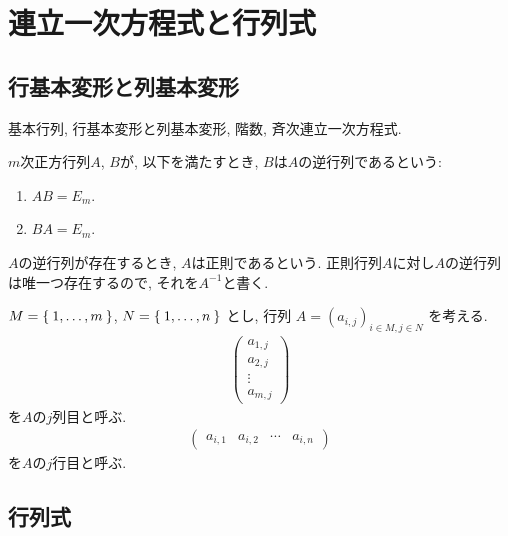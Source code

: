 \section{連立一次方程式と行列式}
\subsection{行基本変形と列基本変形}
基本行列, 行基本変形と列基本変形, 階数, 斉次連立一次方程式.



\begin{definition}
$m$次正方行列$A$, $B$が,
以下を満たすとき, $B$は$A$の逆行列であるという:
\begin{enumerate}
\item $AB=E_m$.
\item $BA=E_m$.
\end{enumerate}
$A$の逆行列が存在するとき, $A$は正則であるという.
正則行列$A$に対し$A$の逆行列は唯一つ存在するので,
それを$A^{-1}$と書く.
\end{definition}



$M=\Set{1,\ldots,m}$,
$N=\Set{1,\ldots,n}$
とし,
行列
$A=(a_{i,j})_{i\in M, j\in N}$
を考える.
\begin{align*}
\begin{pmatrix}
a_{1,j}\\a_{2,j}\\\vdots \\a_{m,j}
\end{pmatrix}
\end{align*}
を$A$の$j$列目と呼ぶ.
\begin{align*}
\begin{pmatrix}
a_{i,1}& a_{i,2}&\cdots &a_{i,n}
\end{pmatrix}
\end{align*}
を$A$の$j$行目と呼ぶ.



\subsection{行列式}



